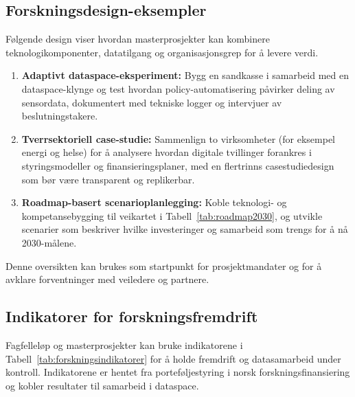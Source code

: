 \subsection{Forskningsdesign-eksempler}
Følgende design viser hvordan masterprosjekter kan kombinere teknologikomponenter, datatilgang og organisasjonsgrep for å levere verdi.
\begin{enumerate}
    \item \textbf{Adaptivt dataspace-eksperiment:} Bygg en sandkasse i samarbeid med en dataspace-klynge og test hvordan policy-automatisering påvirker deling av sensordata, dokumentert med tekniske logger og intervjuer av beslutningstakere.\citep{idsa2023ram,rcn2024programkatalog}
    \item \textbf{Tverrsektoriell case-studie:} Sammenlign to virksomheter (for eksempel energi og helse) for å analysere hvordan digitale tvillinger forankres i styringsmodeller og finansieringsplaner, med en flertrinns casestudiedesign som bør være transparent og replikerbar.\citep{yin2018case}
    \item \textbf{Roadmap-basert scenarioplanlegging:} Koble teknologi- og kompetansebygging til veikartet i Tabell~\ref{tab:roadmap2030}, og utvikle scenarier som beskriver hvilke investeringer og samarbeid som trengs for å nå 2030-målene.\citep{rcn2023veikart}
\end{enumerate}
Denne oversikten kan brukes som startpunkt for prosjektmandater og for å avklare forventninger med veiledere og partnere.

\subsection*{Indikatorer for forskningsfremdrift}
Fagfelleløp og masterprosjekter kan bruke indikatorene i Tabell~\ref{tab:forskningsindikatorer} for å holde fremdrift og datasamarbeid under kontroll. Indikatorene er hentet fra porteføljestyring i norsk forskningsfinansiering og kobler resultater til samarbeid i dataspace.

